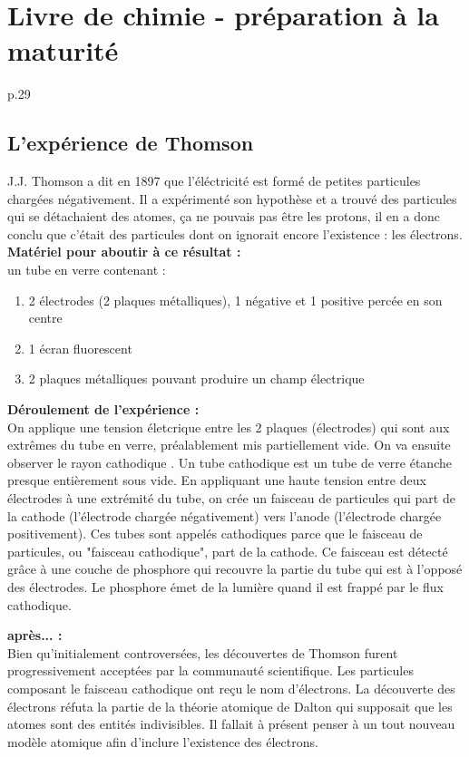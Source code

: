 \documentclass[../main.tex]{subfiles}
\begin{document}
\section{Livre de chimie - préparation à la maturité}
p.29\\
\subsection{L'expérience de Thomson}
J.J. Thomson a dit en 1897 que l'éléctricité est formé de petites particules chargées négativement. Il a expérimenté son hypothèse et a trouvé des particules qui se détachaient des atomes, ça ne pouvais pas être les protons, il en a donc conclu que c'était des particules dont on ignorait encore l'existence : les électrons.\\
\textbf{Matériel pour aboutir à ce résultat :} \\
un tube en verre contenant : \\
\begin{enumerate}
    \item 2 électrodes (2 plaques métalliques), 1 négative et 1 positive percée en son centre
    \item 1 écran fluorescent
    \item 2 plaques métalliques pouvant produire un champ électrique
\end{enumerate}
\textbf{Déroulement de l'expérience :}\\
On applique une tension életcrique entre les 2 plaques (électrodes) qui sont aux extrêmes du tube en verre, préalablement mis partiellement vide. On va ensuite observer le rayon cathodique . Un tube cathodique est un tube de verre étanche presque entièrement sous vide. En appliquant une haute tension entre deux électrodes à une extrémité du tube, on crée un faisceau de particules qui part de la cathode (l'électrode chargée négativement) vers l'anode (l'électrode chargée positivement). Ces tubes sont appelés cathodiques parce que le faisceau de particules, ou "faisceau cathodique", part de la cathode. Ce faisceau est détecté grâce à une couche de phosphore qui recouvre la partie du tube qui est à l'opposé des électrodes. Le phosphore émet de la lumière quand il est frappé par le flux cathodique. 

\textbf{après... : }\\
Bien qu'initialement controversées, les découvertes de Thomson furent progressivement acceptées par la communauté scientifique. Les particules composant le faisceau cathodique ont reçu le nom d'électrons. La découverte des électrons réfuta la partie de la théorie atomique de Dalton qui supposait que les atomes sont des entités indivisibles. Il fallait à présent penser à un tout nouveau modèle atomique afin d'inclure l'existence des électrons. 
\end{document}
